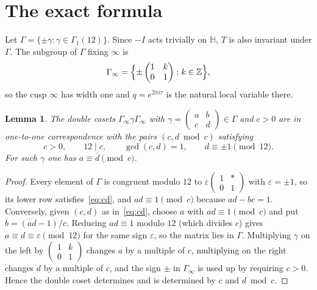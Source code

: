 \documentclass[11pt]{amsart}
\numberwithin{equation}{section}
\newtheorem{lemma}[theorem]{Lemma}
\theoremstyle{definition}
\theoremstyle{remark}
\newcommand{\Z}{\mathbb{Z}}
\newcommand{\inv}[1]{\overline{#1}}
\begin{document}
\section{The exact formula}\label{sec:exact}

Let $\Gamma=\{\pm\gamma:\gamma\in\Gamma_1(12)\}$. Since $-I$ acts trivially on $\mathbb H$, $T$ is also invariant under $\Gamma$. The subgroup of $\Gamma$ fixing $\infty$ is
\[
\Gamma_\infty=\Bigl\{\pm\begin{pmatrix}1&k\\0&1\end{pmatrix}:k\in\Z\Bigr\},
\]
so the cusp $\infty$ has width one and $q=e^{2\pi i\tau}$ is the natural local variable there.

\begin{lemma}\label{lem:cosets}
The double cosets $\Gamma_\infty\gamma\Gamma_\infty$ with $\gamma=\left(\begin{smallmatrix}a&b\\c&d\end{smallmatrix}\right)\in\Gamma$ and $c>0$ are in one-to-one correspondence with the pairs $(c,d\bmod c)$ satisfying
\begin{equation}\label{eq:cd}
c>0,\qquad 12\mid c,\qquad \gcd(c,d)=1,\qquad d\equiv\pm1\pmod{12}.
\end{equation}
For such $\gamma$ one has $a\equiv\inv d\pmod c$.
\end{lemma}

\begin{proof}
Every element of $\Gamma$ is congruent modulo $12$ to $\varepsilon\left(\begin{smallmatrix}1&*\\0&1\end{smallmatrix}\right)$ with $\varepsilon=\pm1$, so its lower row satisfies~\eqref{eq:cd}, and $ad\equiv1\pmod c$ because $ad-bc=1$. Conversely, given $(c,d)$ as in~\eqref{eq:cd}, choose $a$ with $ad\equiv1\pmod c$ and put $b=(ad-1)/c$. Reducing $ad\equiv1$ modulo $12$ (which divides $c$) gives $a\equiv d\equiv\varepsilon\pmod{12}$ for the same sign $\varepsilon$, so the matrix lies in $\Gamma$. Multiplying $\gamma$ on the left by $\left(\begin{smallmatrix}1&k\\0&1\end{smallmatrix}\right)$ changes $a$ by a multiple of $c$, multiplying on the right changes $d$ by a multiple of $c$, and the sign $\pm$ in $\Gamma_\infty$ is used up by requiring $c>0$. Hence the double coset determines and is determined by $c$ and $d\bmod c$.
\end{proof}
\end{document}
